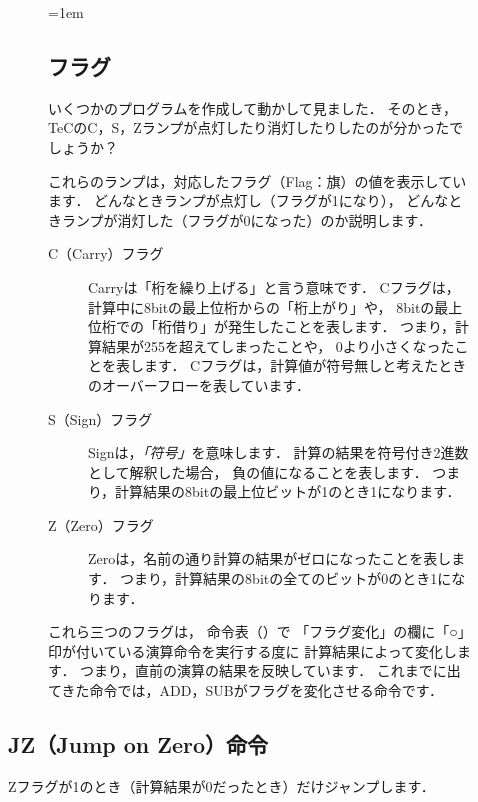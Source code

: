 \begin{figure}[btp]
  \begin{framed}{\parindent=1em
      \subsection*{フラグ}
      いくつかのプログラムを作成して動かして見ました．
      そのとき，
      TeCのC，S，Zランプが点灯したり消灯したりしたのが分かったでしょうか？

      これらのランプは，対応したフラグ（Flag：旗）の値を表示しています．
      どんなときランプが点灯し（フラグが1になり），
      どんなときランプが消灯した（フラグが0になった）のか説明します．

      \begin{description}
      \item[C（Carry）フラグ]
        Carryは「桁を繰り上げる」と言う意味です．
        Cフラグは，
        計算中に8bitの最上位桁からの「桁上がり」や，
        8bitの最上位桁での「桁借り」が発生したことを表します．
        つまり，計算結果が255を超えてしまったことや，
        0より小さくなったことを表します．
        Cフラグは，計算値が符号無しと考えたときのオーバーフローを表しています．
      \item [S（Sign）フラグ]
        Signは，\emph{「符号」}を意味します．
        計算の結果を符号付き2進数として解釈した場合，
        負の値になることを表します．
        つまり，計算結果の8bitの最上位ビットが1のとき1になります．
      \item [Z（Zero）フラグ]
        Zeroは，名前の通り計算の結果がゼロになったことを表します．
        つまり，計算結果の8bitの全てのビットが0のとき1になります．
      \end{description}

      これら三つのフラグは，
      命令表（）で
      「フラグ変化」の欄に「○」印が付いている演算命令を実行する度に
      計算結果によって変化します．
      つまり，直前の演算の結果を反映しています．
      これまでに出てきた命令では，ADD，SUBがフラグを変化させる命令です．
  }\end{framed}
\end{figure}

\newpage
\subsection{JZ（Jump on Zero）命令}
Zフラグが1のとき（計算結果が0だったとき）だけジャンプします．


